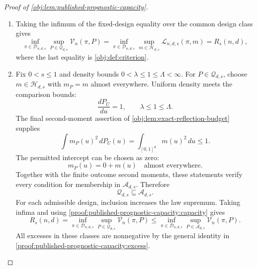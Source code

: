 \documentclass[11pt]{article}
\begin{document}
\begin{proof}[Proof of \cref{obj:lem:published-prognostic-capacity}]
\begin{enumerate}
Conversely, a kernel in that design class has the required fairness. In the experiment generated from independent copies of any single-unit law, drawing signs from \(\pi(X)\) gives
\[
\operatorname{Law}\!\left(
Z\mid X,(O_i(0),O_i(1))_{i=1}^n
\right)
=\pi(X)
=\operatorname{Law}(Z\mid X).
\]
This proves the published conditional-independence requirement throughout its stated law class. Consequently,
\[
\pi\text{ satisfies published admissibility}
\quad\Longleftrightarrow\quad
\pi\in\mathcal D_{n,d,s}.
\]

\item\label{proof:published-prognostic-capacity:capacity} Taking the infimum of the fixed-design equality over the common design class gives
\[
\inf_{\pi\in\mathcal D_{n,d,s}}
\sup_{P\in\mathcal Q_{d,s}}\mathcal V_n(\pi,P)
=
\inf_{\pi\in\mathcal D_{n,d,s}}
\sup_{m\in\mathcal H_{d,s}}\mathcal L_{n,d,s}(\pi,m)
=R_s(n,d),
\]
where the last equality is \cref{obj:def:criterion}.

\item\label{proof:published-prognostic-capacity:comparison} Fix \(0<s\leq1\) and density bounds \(0<\lambda\leq1\leq\Lambda<\infty\). For \(P\in\mathcal Q_{d,s}\), choose \(m\in\mathcal H_{d,s}\) with \(m_P=m\) almost everywhere. Uniform density meets the comparison bounds:
\[
\frac{dP_U}{du}=1,
\qquad
\lambda\leq1\leq\Lambda.
\]
The final second-moment assertion of \cref{obj:lem:exact-reflection-budget} supplies
\[
\int m_P(u)^2\,dP_U(u)
=
\int_{[0,1]^d}m(u)^2\,du
\leq1.
\]
The permitted intercept can be chosen as zero:
\[
m_P(u)=0+m(u)\quad\text{almost everywhere}.
\]
Together with the finite outcome second moments, these statements verify every condition for membership in \(\mathcal A_{d,s}\). Therefore
\[
\mathcal Q_{d,s}\subseteq\mathcal A_{d,s}.
\]
For each admissible design, inclusion increases the law supremum. Taking infima and using \cref{proof:published-prognostic-capacity:capacity} gives
\[
R_s(n,d)
=
\inf_{\pi\in\mathcal D_{n,d,s}}
\sup_{P\in\mathcal Q_{d,s}}\mathcal V_n(\pi,P)
\leq
\inf_{\pi\in\mathcal D_{n,d,s}}
\sup_{P\in\mathcal A_{d,s}}\mathcal V_n(\pi,P).
\]
All excesses in these classes are nonnegative by the general identity in \cref{proof:published-prognostic-capacity:excess}.


\end{enumerate}
\end{proof}
\end{document}
